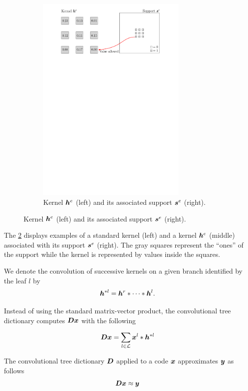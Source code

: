 \begin{figure}[!ht]
\begin{subfigure}[b]{0.79\textwidth}
\includegraphics[width=0.80\textwidth]{figures/kernel-h_e.pdf}
\caption{Kernel $\bm{h}^e$ (left) and its associated support $\bm{s}^e$ (right).}\label{fig_example_kernel}
\end{subfigure}
\end{figure}
The \cref{fig_example_kernel} displays examples of a standard kernel (left) and a kernel $\bm{h}^e$ (middle) associated with its support $\bm{s}^e$ (right). The gray squares represent the “ones” of the support while the kernel is represented by values inside the squares.

We denote the convolution of successive kernels on a given branch identified by the leaf $l$ by
$$\bm{h}^{*l} = \bm{h}^r * \dots * \bm{h}^l.$$

Instead of using the standard matrix-vector product, the convolutional tree dictionary computes $\bm{D}\bm{x}$ with the following

\begin{align}
	\bm{D}\bm{x} = \sum_{l \in \mathcal L} \bm{x}^l * \bm{h}^{*l} \label{eq_Dx_as_convolution}
\end{align}

The convolutional tree dictionary $\bm{D}$ applied to a code $\bm{x}$ approximates $\bm{y}$ as follows
$$\bm{D}\bm{x} \approx \bm{y}$$

